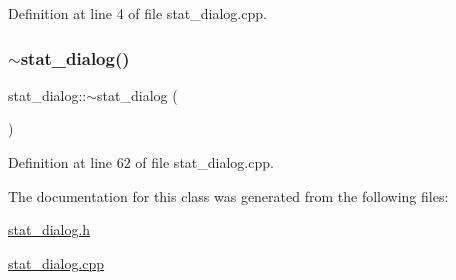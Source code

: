 Definition at line 4 of file stat\+\_\+dialog.\+cpp.

\mbox{\label{classstat__dialog_ac628e47d8eb4d3972ec6dbf6f42d6df3}} 
\subsubsection{\texorpdfstring{$\sim$stat\_dialog()}{~stat\_dialog()}}
{\footnotesize\ttfamily stat\+\_\+dialog\+::$\sim$stat\+\_\+dialog (\begin{DoxyParamCaption}{ }\end{DoxyParamCaption})}



Definition at line 62 of file stat\+\_\+dialog.\+cpp.



The documentation for this class was generated from the following files\+:\begin{DoxyCompactItemize}
\item 
\mbox{\hyperlink{stat__dialog_8h}{stat\+\_\+dialog.\+h}}\item 
\mbox{\hyperlink{stat__dialog_8cpp}{stat\+\_\+dialog.\+cpp}}\end{DoxyCompactItemize}
